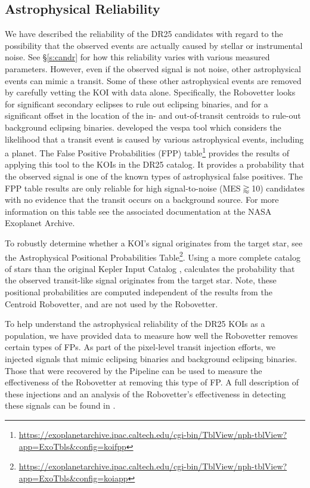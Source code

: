 \subsection{Astrophysical Reliability}
We have described the reliability of the DR25 candidates with regard to the possibility that the observed events are actually caused by stellar or instrumental noise. See \S\ref{s:candr} for how this reliability varies with various measured parameters.  However, even if the observed signal is not noise, other astrophysical events can mimic a transit.  Some of these other astrophysical events are removed by carefully vetting the KOI with \Kepler{} data alone.  Specifically, the Robovetter looks for significant secondary eclipses to rule out eclipsing binaries, and for a significant offset in the location of the in- and out-of-transit centroids to rule-out background eclipsing binaries. \citet[][]{Morton2016} developed the vespa tool which considers the likelihood that a transit event is caused by various astrophysical events, including a planet.  The False Positive Probabilities (FPP) table\footnote{\url{https://exoplanetarchive.ipac.caltech.edu/cgi-bin/TblView/nph-tblView?app=ExoTbls&config=koifpp}} provides the results of applying this tool to the KOIs in the DR25 catalog. It provides a probability that the observed signal is one of the known types of astrophysical false positives.  The FPP table results are only reliable for high signal-to-noise (MES$\gtrapprox$10) candidates with no evidence that the transit occurs on a background source.  For more information on this table see the associated documentation at the NASA Exoplanet Archive.

To robustly determine whether a KOI's signal originates from the target star, see the Astrophysical Positional Probabilities Table\footnote{\url{https://exoplanetarchive.ipac.caltech.edu/cgi-bin/TblView/nph-tblView?app=ExoTbls&config=koiapp}}.  Using a more complete catalog of stars than the original Kepler Input Catalog \citep{Brown2011}, \citet{Bryson2017a} calculates the probability that the observed transit-like signal originates from the target star. Note, these positional probabilities are computed independent of the results from the Centroid Robovetter, and are not used by the Robovetter. 

To help understand the astrophysical reliability of the DR25 KOIs as a population, we have provided data to measure how well the Robovetter removes certain types of FPs.  As part of the pixel-level transit injection efforts, we injected signals that mimic eclipsing binaries and background eclipsing binaries. Those that were recovered by the \Kepler{} Pipeline can be used to measure the effectiveness of the Robovetter at removing this type of FP. A full description of these injections and an analysis of the Robovetter's effectiveness in detecting these signals can be found in \citet{Coughlin2017a}.



